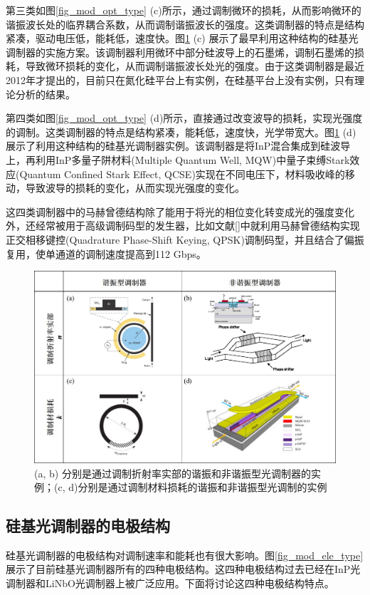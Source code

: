 第三类如图\ref{fig_mod_opt_type} (c)所示，通过调制微环的损耗，从而影响微环的谐振波长处的临界耦合系数，从而调制谐振波长的强度。这类调制器的特点是结构紧凑，驱动电压低，能耗低，速度快。图\ref{fig_mod_opt_type_real} (c) 展示了最早利用这种结构的硅基光调制器的实施方案\cite{Midrio2012graphene}。该调制器利用微环中部分硅波导上的石墨烯，调制石墨烯的损耗，导致微环损耗的变化，从而调制谐振波长处光的强度。由于这类调制器是最近2012年才提出的，目前只在氮化硅平台上有实例\cite{phare2015graphene}，在硅基平台上没有实例，只有理论分析的结果\cite{Midrio2012graphene}。

第四类如图\ref{fig_mod_opt_type} (d)所示，直接通过改变波导的损耗，实现光强度的调制。这类调制器的特点是结构紧凑，能耗低，速度快，光学带宽大。图\ref{fig_mod_opt_type_real} (d) 展示了利用这种结构的硅基光调制器实例\cite{tang201150}。该调制器是将InP混合集成到硅波导上，再利用InP多量子阱材料(Multiple Quantum Well, MQW)中量子束缚Stark效应(Quantum Confined Stark Effect, QCSE)实现在不同电压下，材料吸收峰的移动，导致波导的损耗的变化，从而实现光强度的变化。

这四类调制器中的马赫曾德结构除了能用于将光的相位变化转变成光的强度变化外，还经常被用于高级调制码型的发生器，比如文献[]中就利用马赫曾德结构实现正交相移键控(Quadrature Phase-Shift Keying, QPSK)调制码型，并且结合了偏振复用，使单通道的调制速度提高到112 Gbps。
\begin{figure}[htb]
	\centering
	\includegraphics[width=12cm]{./Pictures/fig_mod_opt_type_real.jpg}
	\caption{ (a, b) 分别是通过调制折射率实部的谐振和非谐振型光调制器的实例\cite{xu2005micrometre,liu2004high}；(c, d)分别是通过调制材料损耗的谐振和非谐振型光调制的实例\cite{Midrio2012graphene,tang201150}}
	\label{fig_mod_opt_type_real}
\end{figure}

\subsection{硅基光调制器的电极结构} \label{electrostructure}
硅基光调制器的电极结构对调制速率和能耗也有很大影响。图\ref{fig_mod_ele_type}展示了目前硅基光调制器所有的四种电极结构。这四种电极结构过去已经在InP光调制器和LiNbO光调制器上被广泛应用。下面将讨论这四种电极结构特点。

